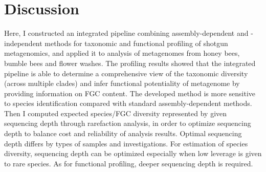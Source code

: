 \documentclass[11pt]{article}
\begin{document}

\section{Discussion}
Here, I constructed an integrated pipeline combining assembly-dependent and -independent methods for taxonomic and functional profiling of shotgun metagenomics, and applied it to analysis of metagenomes from honey bees, bumble bees and flower washes. 
The profiling results showed that the integrated pipeline is able to determine a comprehensive view of the taxonomic diversity (across multiple clades) and infer functional potentiality of metagenome by providing information on FGC content. 
The developed method is more sensitive to species identification compared with standard assembly-dependent methods. 
Then I computed expected species/FGC diversity represented by given sequencing depth through rarefaction analysis, in order to optimize sequencing depth to balance cost and reliability of analysis results. 
Optimal sequencing depth differs by types of samples and investigations. 
For estimation of species diversity, sequencing depth can be optimized especially when low leverage is given to rare species. 
As for functional profiling, deeper sequencing depth is required.  
\end{document}
